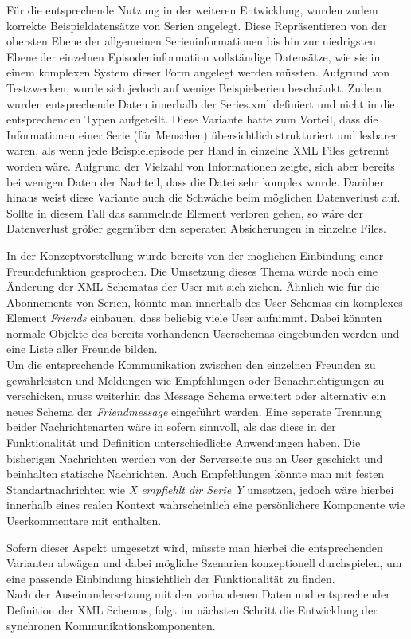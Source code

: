 Für die entsprechende Nutzung in der weiteren Entwicklung, wurden zudem korrekte Beispieldatensätze von Serien angelegt. Diese Repräsentieren von der obersten Ebene der allgemeinen Serieninformationen bis hin zur niedrigsten Ebene der einzelnen Episodeninformation vollständige Datensätze, wie sie in einem komplexen System dieser Form angelegt werden müssten. Aufgrund von Testzwecken, wurde sich jedoch auf wenige Beispielserien beschränkt. Zudem wurden entsprechende Daten innerhalb der Series.xml definiert und nicht in die entsprechenden Typen aufgeteilt. Diese Variante hatte zum Vorteil, dass die Informationen einer Serie (für Menschen) übersichtlich strukturiert und lesbarer waren, als wenn jede Beispielepisode per Hand in einzelne XML Files getrennt worden wäre.
Aufgrund der Vielzahl von Informationen zeigte, sich aber bereits bei wenigen Daten der Nachteil, dass die Datei sehr komplex wurde. Darüber hinaus weist diese Variante auch die Schwäche beim möglichen Datenverlust auf. Sollte in diesem Fall das sammelnde Element verloren gehen, so wäre der Datenverlust größer gegenüber den seperaten Absicherungen in einzelne Files.


\parskip 12pt
\parindent 0pt
In der Konzeptvorstellung wurde bereits von der möglichen Einbindung einer Freundefunktion gesprochen. Die Umsetzung dieses Thema würde noch eine Änderung der XML Schematas der User mit sich ziehen. Ähnlich wie für die Abonnements von Serien, könnte man innerhalb des User Schemas ein komplexes Element \textit{Friends} einbauen, dass beliebig viele User aufnimmt. Dabei könnten normale Objekte des bereits vorhandenen Userschemas eingebunden werden und eine Liste aller Freunde bilden.\\ Um die entsprechende Kommunikation zwischen den einzelnen Freunden zu gewährleisten und Meldungen wie Empfehlungen oder Benachrichtigungen zu verschicken, muss weiterhin das Message Schema erweitert oder alternativ ein neues Schema der \textit{Friendmessage} eingeführt werden. Eine seperate Trennung beider Nachrichtenarten wäre in sofern sinnvoll, als das diese in der Funktionalität und Definition unterschiedliche Anwendungen haben. Die bisherigen Nachrichten werden von der Serverseite aus an User geschickt und beinhalten statische Nachrichten. Auch Empfehlungen könnte man mit festen Standartnachrichten wie \textit{X empfiehlt dir Serie Y} umsetzen, jedoch wäre hierbei innerhalb eines realen Kontext wahrscheinlich eine persönlichere Komponente wie Userkommentare mit enthalten.


\parskip 12pt
\parindent 0pt
Sofern dieser Aspekt umgesetzt wird, müsste man hierbei die entsprechenden Varianten abwägen und dabei mögliche Szenarien konzeptionell durchspielen, um eine passende Einbindung hinsichtlich der Funktionalität zu finden.\\
Nach der Auseinandersetzung mit den vorhandenen Daten und entsprechender Definition der XML Schemas, folgt im nächsten Schritt die Entwicklung der synchronen Kommunikationskomponenten.


